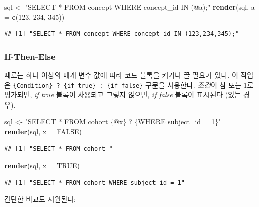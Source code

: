 \documentclass[11pt]{book}
\newenvironment{Shaded}{\begin{snugshade}}{\end{snugshade}}
\newcommand{\KeywordTok}[1]{\textcolor[rgb]{0.13,0.29,0.53}{\textbf{#1}}}
\newcommand{\DataTypeTok}[1]{\textcolor[rgb]{0.13,0.29,0.53}{#1}}
\newcommand{\DecValTok}[1]{\textcolor[rgb]{0.00,0.00,0.81}{#1}}
\newcommand{\StringTok}[1]{\textcolor[rgb]{0.31,0.60,0.02}{#1}}
\newcommand{\OtherTok}[1]{\textcolor[rgb]{0.56,0.35,0.01}{#1}}
\newcommand{\NormalTok}[1]{#1}
\theoremstyle{definition}
\theoremstyle{definition}
\theoremstyle{definition}
\theoremstyle{remark}
\begin{document}
\begin{Shaded}
\begin{Highlighting}[]
\NormalTok{sql <-}\StringTok{ "SELECT * FROM concept WHERE concept_id IN (@a);"}
\KeywordTok{render}\NormalTok{(sql, }\DataTypeTok{a =} \KeywordTok{c}\NormalTok{(}\DecValTok{123}\NormalTok{, }\DecValTok{234}\NormalTok{, }\DecValTok{345}\NormalTok{))}
\end{Highlighting}
\end{Shaded}

\begin{verbatim}
## [1] "SELECT * FROM concept WHERE concept_id IN (123,234,345);"
\end{verbatim}

\subsubsection*{If-Then-Else}\label{if-then-else}

때로는 하나 이상의 매개 변수 값에 따라 코드 블록을 켜거나 끌 필요가
있다. 이 작업은
\texttt{\{Condition\}\ ?\ \{if\ true\}\ :\ \{if\ false\}} 구문을
사용한다. \emph{조건}이 참 또는 1로 평가되면, \emph{if true} 블록이
사용되고 그렇지 않으면, \emph{if false} 블록이 표시된다 (있는 경우).

\begin{Shaded}
\begin{Highlighting}[]
\NormalTok{sql <-}\StringTok{ "SELECT * FROM cohort \{@x\} ? \{WHERE subject_id = 1\}"}
\KeywordTok{render}\NormalTok{(sql, }\DataTypeTok{x =} \OtherTok{FALSE}\NormalTok{)}
\end{Highlighting}
\end{Shaded}

\begin{verbatim}
## [1] "SELECT * FROM cohort "
\end{verbatim}

\begin{Shaded}
\begin{Highlighting}[]
\KeywordTok{render}\NormalTok{(sql, }\DataTypeTok{x =} \OtherTok{TRUE}\NormalTok{)}
\end{Highlighting}
\end{Shaded}

\begin{verbatim}
## [1] "SELECT * FROM cohort WHERE subject_id = 1"
\end{verbatim}

간단한 비교도 지원된다:
\end{document}
